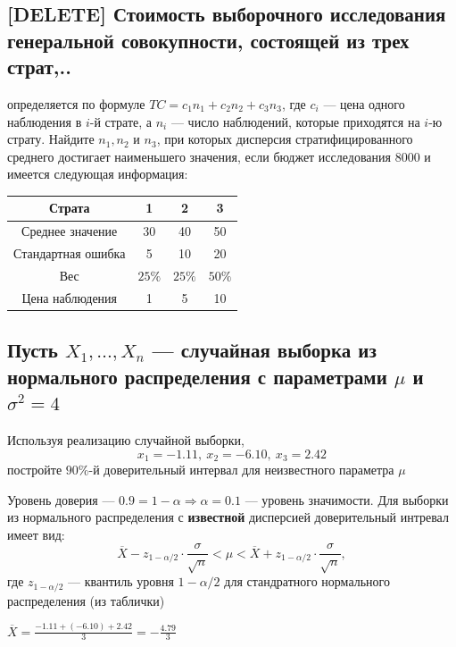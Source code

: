 \documentclass{article}
\begin{document}
\subsection{[DELETE] Стоимость выборочного исследования генеральной совокупности, состоящей из трех страт,..}
определяется по формуле $T C=c_{1} n_{1}+c_{2} n_{2}+c_{3} n_{3}$, где $c_{i}$ — цена одного наблюдения в $i$-й страте, а $n_{i}$ — число наблюдений, которые приходятся на $i$-ю страту. Найдите $n_{1}, n_{2}$ и $n_{3}$, при которых дисперсия стратифицированного среднего достигает наименьшего значения, если бюджет исследования 8000 и имеется следующая информация:
\begin{center}
    \begin{tabular}{cccc}
        \hline Страта & 1 & 2 & 3 \\
        \hline Среднее значение & 30 & 40 & 50 \\
        Стандартная ошибка & 5 & 10 & 20 \\
        Вес & $25 \%$ & $25 \%$ & $50 \%$ \\
        Цена наблюдения & 1 & 5 & 10 \\
        \hline
    \end{tabular}    
\end{center}

\subsection{Пусть $X_{1}, \ldots, X_{n}$ — случайная выборка из нормального распределения с параметрами $\mu$ и $\sigma^{2}=4$}
Используя реализацию случайной выборки,
\begin{equation*}
    x_{1}=-1.11,\ x_{2}=-6.10,\ x_{3}=2.42
\end{equation*}
постройте $90 \%$-й доверительный интервал для неизвестного параметра $\mu$

Уровень доверия — $0.9=1-\alpha\Longrightarrow\alpha=0.1$ — уровень значимости. Для выборки из нормального распределения с \textbf{известной} дисперсией доверительный интревал имеет вид:
\begin{equation*}
    \overline{X}-z_{1-\alpha/2}\cdot\frac{\sigma}{\sqrt{n}}<\mu<\overline{X}+z_{1-\alpha/2}\cdot\frac{\sigma}{\sqrt{n}},
\end{equation*}
где $z_{1-\alpha/2}$ — квантиль уровня $1-\alpha/2$ для стандратного нормального распределения (из таблички)

\comment $\overline{X}=\displaystyle\frac{-1.11+(-6.10)+2.42}{3}=-\frac{4.79}{3}$
\end{document}
